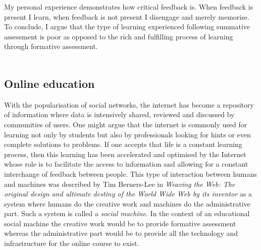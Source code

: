 \documentclass[11pt, oneside]{article}   	%
\begin{document}
My personal experience demonstrates how critical feedback is. When feedback is present I learn, when feedback is not present I disengage and merely memorise. To conclude, I argue that the type of learning experienced following summative assessment is poor as opposed to the rich and fulfilling process of learning through formative assessment.\\\\
\subsection{Online education}
With the popularisation of social networks, the internet has become a repository of information where data is intensively shared, reviewed and discussed by communities of users. One might argue that the internet is commonly used for learning not only by students but also by professionals looking for hints or even complete solutions to problems. If one accepts that life is a constant learning process, then this learning has been accelerated and optimised by the Internet whose role is to facilitate the access to information and allowing for a constant interchange of feedback between people. This type of interaction between humans and machines was described by Tim Berners-Lee in {\it Weaving the Web: The original design and ultimate destiny of the World Wide Web by its inventor} \cite{berners2000weaving} as a system where humans do the creative work and machines do the administrative part. Such a system is called a {\it social machine}. In the context of an educational social machine the creative work would be to provide formative assessment whereas the administrative part would be to provide all the technology and infrastructure for the online course to exist.\\\\
\end{document}
